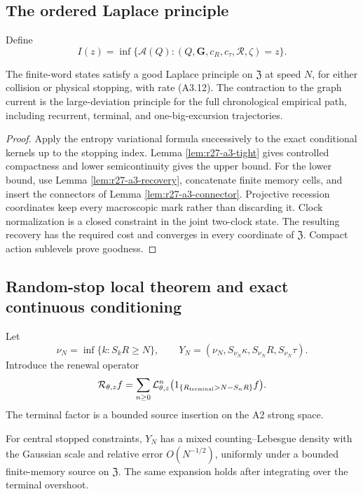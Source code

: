 \subsection{The ordered Laplace principle}

Define
\[
 I(z)=\inf\{\mathcal A(Q): (Q,\mathbf G,c_R,c_\tau,\mathcal R,\zeta)=z\}.
                                                                    \tag{A3.12}
\]

\begin{theorem}
\label{thm:r27-a3-ldp}
The finite-word states satisfy a good Laplace principle on $\mathfrak Z$ at
speed $N$, for either collision or physical stopping, with rate (A3.12).
The contraction to the graph current is the large-deviation principle for the
full chronological empirical path, including recurrent, terminal, and
one-big-excursion trajectories.
\end{theorem}

\begin{proof}
Apply the entropy variational formula successively to the exact conditional
kernels up to the stopping index.  Lemma \ref{lem:r27-a3-tight} gives
controlled compactness and lower semicontinuity gives the upper bound.  For
the lower bound, use Lemma \ref{lem:r27-a3-recovery}, concatenate finite
memory cells, and insert the connectors of Lemma
\ref{lem:r27-a3-connector}.  Projective recession coordinates keep every
macroscopic mark rather than discarding it.  Clock normalization is a closed
constraint in the joint two-clock state.  The resulting recovery has the
required cost and converges in every coordinate of $\mathfrak Z$.  Compact
action sublevels prove goodness.
\end{proof}

\subsection{Random-stop local theorem and exact continuous conditioning}

Let
\[
 \nu_N=\inf\{k:S_kR\ge N\},\qquad
 Y_N=(\nu_N,S_{\nu_N}\kappa,S_{\nu_N}R,S_{\nu_N}\tau).
\]
Introduce the renewal operator
\[
 \mathcal R_{\theta,z}f
 =\sum_{n\ge0}\mathcal L_{\theta,z}^n
  \bigl(1_{\{R_{\rm terminal}>N-S_nR\}}f\bigr).
\]
The terminal factor is a bounded source insertion on the A2 strong space.

\begin{theorem}
\label{thm:r27-a3-stopped-local}
For central stopped constraints, $Y_N$ has a mixed
counting--Lebesgue density with the Gaussian scale and relative error
$O(N^{-1/2})$, uniformly under a bounded finite-memory source on
$\mathfrak Z$.  The same expansion holds after integrating over the terminal
overshoot.
\end{theorem}

